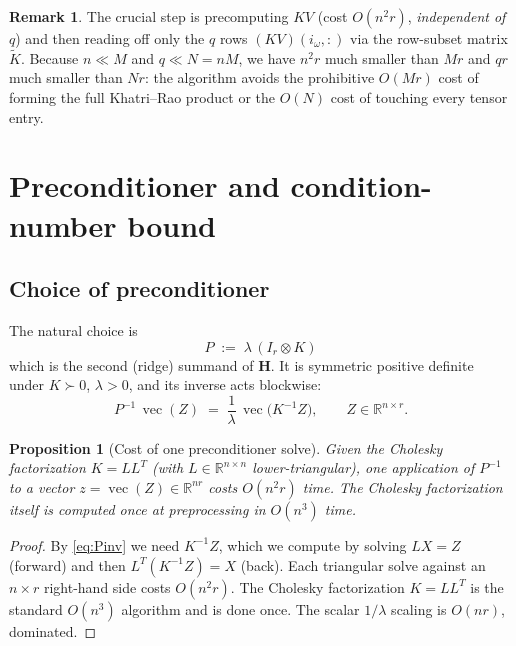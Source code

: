 \documentclass[12pt]{article}
\newtheorem{proposition}[theorem]{Proposition}
\theoremstyle{definition}
\newtheorem{remark}[theorem]{Remark}
\newcommand{\vecop}{\operatorname{vec}}
\newcommand{\R}{\mathbb{R}}
\newcommand{\Kt}{\widetilde{K}}
\begin{document}
\begin{remark}\label{rmk:matvec-savings}
The crucial step is precomputing $KV$ (cost $O(n^2r)$, \emph{independent of $q$}) and then
reading off only the $q$ rows $(KV)(i_\omega,:)$ via the row-subset matrix $\Kt$. Because
$n\ll M$ and $q\ll N=nM$, we have $n^2r$ much smaller than $Mr$ and $qr$ much smaller than $Nr$:
the algorithm avoids the prohibitive $O(M r)$ cost of forming the full Khatri--Rao product or
the $O(N)$ cost of touching every tensor entry.
\end{remark}

\section{Preconditioner and condition-number bound}\label{sec:precond}

\subsection{Choice of preconditioner}

The natural choice is
\begin{equation}\label{eq:P-def}
P \;:=\; \lambda\,(I_r\otimes K)
\end{equation}
which is the second (ridge) summand of $\mathbf{H}$. It is symmetric positive definite under
$K\succ 0$, $\lambda>0$, and its inverse acts blockwise:
\begin{equation}\label{eq:Pinv}
P^{-1}\,\vecop(Z) \;=\; \frac{1}{\lambda}\,\vecop\!\bigl(K^{-1} Z\bigr),
\qquad Z\in\R^{n\times r}.
\end{equation}

\begin{proposition}[Cost of one preconditioner solve]\label{prop:Pinv-cost}
Given the Cholesky factorization $K=LL^T$ (with $L\in\R^{n\times n}$ lower-triangular), one
application of $P^{-1}$ to a vector $z=\vecop(Z)\in\R^{nr}$ costs $O(n^2 r)$ time. The Cholesky
factorization itself is computed once at preprocessing in $O(n^3)$ time.
\end{proposition}

\begin{proof}
By \eqref{eq:Pinv} we need $K^{-1}Z$, which we compute by solving $LX=Z$ (forward) and then
$L^T(K^{-1}Z)=X$ (back). Each triangular solve against an $n\times r$ right-hand side costs
$O(n^2 r)$. The Cholesky factorization $K=LL^T$ is the standard $O(n^3)$ algorithm and is done
once. The scalar $1/\lambda$ scaling is $O(nr)$, dominated.
\end{proof}
\end{document}
